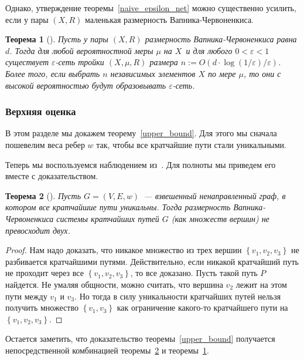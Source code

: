 \documentclass[12pt]{article}
\newcommand{\eps}{\varepsilon}
\newcommand{\set}[1]{\left\{#1\right\}}
\newtheorem{theorem}{Теорема}
\begin{document}
    Однако, утверждение теоремы~\ref{naive_epsilon_net} можно существенно усилить, если у пары $(X, R)$
    маленькая размерность Вапника-Червоненкиса.

    \begin{theorem}[\cite{HW86}]
        \label{full_epsilon_net}
        Пусть у пары $(X, R)$ размерность Вапника-Червоненкиса равна $d$. Тогда для любой вероятностной меры $\mu$ на $X$\
        и для любого $0 < \varepsilon < 1$ существует $\varepsilon$-сеть тройки $(X, \mu, R)$ размера
        $n := O(d \cdot \log(1 / \varepsilon) / \varepsilon)$.
        Более того, если выбрать $n$ независимых элементов $X$ по мере $\mu$, то они с высокой вероятностью будут
        образовывать $\eps$-сеть.
    \end{theorem}
    \subsubsection{Верхняя оценка}
    \label{subsubsection_upper_bound}
    В этом разделе мы докажем теорему~\ref{upper_bound}.
    Для этого мы сначала пошевелим веса ребер $w$ так, чтобы все кратчайшие пути стали уникальными.

    Теперь мы воспользуемся наблюдением из~\cite{ADFGW11}. Для полноты мы приведем его вместе с доказательством.
    \begin{theorem}[\cite{ADFGW11}]
        \label{unique_vc_dimension}
        Пусть $G = (V, E, w)$~--- взвешенный ненаправленный граф, в котором все кратчайшие пути уникальны.
        Тогда размерность Вапника-Червоненкиса системы кратчайших путей $G$ (как множеств вершин)
        не превосходит двух.
    \end{theorem}
    \begin{proof}
        Нам надо доказать, что никакое множество из трех вершин $\set{v_1, v_2, v_3}$ не разбивается кратчайшими путями.
        Действительно, если никакой кратчайший путь не проходит через все $\set{v_1, v_2, v_3}$, то все доказано.
        Пусть такой путь $P$ найдется. Не умаляя общности, можно считать, что вершина $v_2$ лежит на этом пути между
        $v_1$ и $v_3$. Но тогда в силу уникальности кратчайших путей нельзя получить множество $\set{v_1, v_3}$
        как ограничение какого-то кратчайшего пути на $\set{v_1, v_2, v_3}$.
    \end{proof}

    Остается заметить, что доказательство теоремы~\ref{upper_bound} получается непосредственной комбинацией
    теоремы~\ref{unique_vc_dimension} и теоремы~\ref{full_epsilon_net}.
\end{document}
